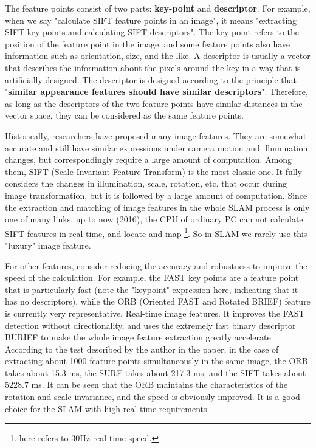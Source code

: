 The feature points consist of two parts: \textbf{key-point} and \textbf{descriptor}. For example, when we say "calculate SIFT feature points in an image", it means "extracting SIFT key points and calculating SIFT descriptors". The key point refers to the position of the feature point in the image, and some feature points also have information such as orientation, size, and the like. A descriptor is usually a vector that describes the information about the pixels around the key in a way that is artificially designed. The descriptor is designed according to the principle that "\textbf{similar appearance features should have similar descriptors}". Therefore, as long as the descriptors of the two feature points have similar distances in the vector space, they can be considered as the same feature points.

Historically, researchers have proposed many image features. They are somewhat accurate and still have similar expressions under camera motion and illumination changes, but correspondingly require a large amount of computation. Among them, SIFT (Scale-Invariant Feature Transform) is the most classic one. It fully considers the changes in illumination, scale, rotation, etc. that occur during image transformation, but it is followed by a large amount of computation. Since the extraction and matching of image features in the whole SLAM process is only one of many links, up to now (2016), the CPU of ordinary PC can not calculate SIFT features in real time, and locate and map \footnote{here refers to 30Hz real-time speed. }. So in SLAM we rarely use this "luxury" image feature.

For other features, consider reducing the accuracy and robustness to improve the speed of the calculation. For example, the FAST key points are a feature point that is particularly fast (note the "keypoint" expression here, indicating that it has no descriptors), while the ORB (Oriented FAST and Rotated BRIEF) feature is currently very representative. Real-time image features. It improves the FAST detection \textsuperscript{\cite{Rosten2006}} without directionality, and uses the extremely fast binary descriptor BURIEF\textsuperscript{\cite{calonder2010brief}} to make the whole image feature extraction greatly accelerate. According to the test described by the author in the paper, in the case of extracting about 1000 feature points simultaneously in the same image, the ORB takes about 15.3 ms, the SURF takes about 217.3 ms, and the SIFT takes about 5228.7 ms. It can be seen that the ORB maintains the characteristics of the rotation and scale invariance, and the speed is obviously improved. It is a good choice for the SLAM with high real-time requirements.

